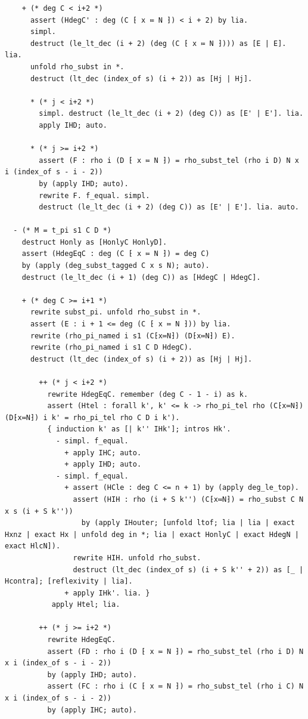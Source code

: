 \begin{latin}
\begin{verbatim}
    + (* deg C < i+2 *)
      assert (HdegC' : deg (C ⁅ x ≔ N ⁆) < i + 2) by lia.
      simpl.
      destruct (le_lt_dec (i + 2) (deg (C ⁅ x ≔ N ⁆))) as [E | E]. lia.
      unfold rho_subst in *.
      destruct (lt_dec (index_of s) (i + 2)) as [Hj | Hj].

      * (* j < i+2 *)
        simpl. destruct (le_lt_dec (i + 2) (deg C)) as [E' | E']. lia.
        apply IHD; auto.

      * (* j >= i+2 *)
        assert (F : rho i (D ⁅ x ≔ N ⁆) = rho_subst_tel (rho i D) N x i (index_of s - i - 2))
        by (apply IHD; auto).
        rewrite F. f_equal. simpl.
        destruct (le_lt_dec (i + 2) (deg C)) as [E' | E']. lia. auto.

  - (* M = t_pi s1 C D *)
    destruct Honly as [HonlyC HonlyD].
    assert (HdegEqC : deg (C ⁅ x ≔ N ⁆) = deg C)
    by (apply (deg_subst_tagged C x s N); auto).
    destruct (le_lt_dec (i + 1) (deg C)) as [HdegC | HdegC].

    + (* deg C >= i+1 *)
      rewrite subst_pi. unfold rho_subst in *.
      assert (E : i + 1 <= deg (C ⁅ x ≔ N ⁆)) by lia.
      rewrite (rho_pi_named i s1 (C⁅x≔N⁆) (D⁅x≔N⁆) E).
      rewrite (rho_pi_named i s1 C D HdegC).
      destruct (lt_dec (index_of s) (i + 2)) as [Hj | Hj].

        ++ (* j < i+2 *)
          rewrite HdegEqC. remember (deg C - 1 - i) as k.
          assert (Htel : forall k', k' <= k -> rho_pi_tel rho (C⁅x≔N⁆) (D⁅x≔N⁆) i k' = rho_pi_tel rho C D i k').
          { induction k' as [| k'' IHk']; intros Hk'.
            - simpl. f_equal.
              + apply IHC; auto.
              + apply IHD; auto.
            - simpl. f_equal.
              + assert (HCle : deg C <= n + 1) by (apply deg_le_top).
                assert (HIH : rho (i + S k'') (C⁅x≔N⁆) = rho_subst C N x s (i + S k''))
                  by (apply IHouter; [unfold ltof; lia | lia | exact Hxnz | exact Hx | unfold deg in *; lia | exact HonlyC | exact HdegN | exact HlcN]).
                rewrite HIH. unfold rho_subst.
                destruct (lt_dec (index_of s) (i + S k'' + 2)) as [_ | Hcontra]; [reflexivity | lia].
              + apply IHk'. lia. }
           apply Htel; lia.

        ++ (* j >= i+2 *)
          rewrite HdegEqC.
          assert (FD : rho i (D ⁅ x ≔ N ⁆) = rho_subst_tel (rho i D) N x i (index_of s - i - 2))
          by (apply IHD; auto).
          assert (FC : rho i (C ⁅ x ≔ N ⁆) = rho_subst_tel (rho i C) N x i (index_of s - i - 2))
          by (apply IHC; auto).


\end{verbatim}
\end{latin}
